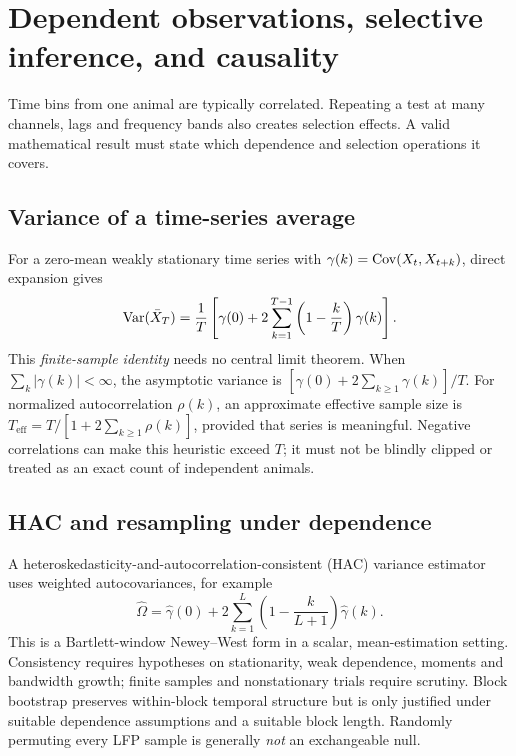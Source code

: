 \chapter[Dependent inference and causality]{Dependent observations, selective inference, and causality}
\label{ch:dependent-inference}
Time bins from one animal are typically correlated.
Repeating a test at many channels, lags and frequency bands
also creates selection effects. A valid mathematical result
must state which dependence and selection operations it covers.

\section{Variance of a time-series average}
For a zero-mean weakly stationary time series with
$\gamma(k)=\operatorname{Cov}(X_t,X_{t+k})$, direct expansion gives
\[
\operatorname{Var}(\bar X_T)=\frac{1}{T}
\left[\gamma(0)+2\sum_{k=1}^{T-1}
\left(1-\frac{k}{T}\right)\gamma(k)\right].
\]
This \emph{finite-sample identity} needs no central limit theorem.
When $\sum_k|\gamma(k)|<\infty$, the asymptotic variance is
$[\gamma(0)+2\sum_{k\ge1}\gamma(k)]/T$.
For normalized autocorrelation $\rho(k)$, an approximate effective
sample size is
$T_{\mathrm{eff}}=T/[1+2\sum_{k\ge1}\rho(k)]$,
provided that series is meaningful. Negative correlations can make
this heuristic exceed $T$; it must not be blindly clipped or treated
as an exact count of independent animals.

\section{HAC and resampling under dependence}
A heteroskedasticity-and-autocorrelation-consistent (HAC)
variance estimator uses weighted autocovariances, for example
\[
\widehat\Omega=\widehat\gamma(0)
 +2\sum_{k=1}^{L}\left(1-\frac{k}{L+1}\right)
 \widehat\gamma(k).
\]
This is a Bartlett-window Newey--West form in a scalar,
mean-estimation setting. Consistency requires hypotheses on
stationarity, weak dependence, moments and bandwidth growth;
finite samples and nonstationary trials require scrutiny.
Block bootstrap preserves within-block temporal structure
but is only justified under suitable dependence assumptions
and a suitable block length. Randomly permuting every LFP
sample is generally \emph{not} an exchangeable null.

